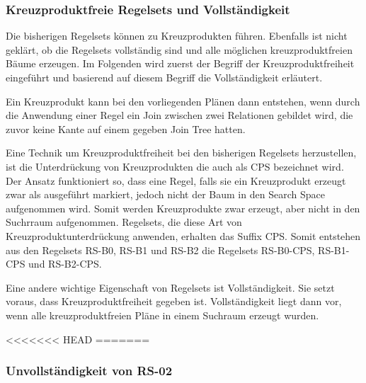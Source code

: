 \subsubsection{Kreuzproduktfreie Regelsets und Vollständigkeit}

Die bisherigen Regelsets können zu Kreuzprodukten führen. Ebenfalls ist nicht geklärt, ob die Regelsets vollständig sind und alle möglichen kreuzproduktfreien Bäume erzeugen. Im Folgenden wird zuerst der Begriff der Kreuzproduktfreiheit eingeführt und basierend auf diesem Begriff die Vollständigkeit erläutert.

Ein Kreuzprodukt kann bei den vorliegenden Plänen dann entstehen, wenn durch die Anwendung einer Regel ein Join zwischen zwei Relationen gebildet wird, die zuvor keine Kante auf einem gegeben Join Tree hatten.

Eine Technik um Kreuzproduktfreiheit bei den bisherigen Regelsets herzustellen, ist die Unterdrückung von Kreuzprodukten die auch als \ac{CPS} bezeichnet wird. Der Ansatz funktioniert so, dass eine Regel, falls sie ein Kreuzprodukt erzeugt zwar als ausgeführt markiert, jedoch nicht der Baum in den Search Space aufgenommen wird. Somit werden Kreuzprodukte zwar erzeugt, aber nicht in den Suchrraum aufgenommen. Regelsets, die diese Art von Kreuzproduktunterdrückung anwenden, erhalten das Suffix CPS. Somit entstehen aus den Regelsets RS-B0, RS-B1 und RS-B2 die Regelsets RS-B0-CPS, RS-B1-CPS und RS-B2-CPS.


Eine andere wichtige Eigenschaft von Regelsets ist Vollständigkeit. Sie setzt voraus, dass Kreuzproduktfreiheit gegeben ist. Vollständigkeit liegt dann vor, wenn alle kreuzproduktfreien Pläne in einem Suchraum erzeugt wurden.


<<<<<<< HEAD
=======
\subsubsection{Unvollständigkeit von RS-02}


